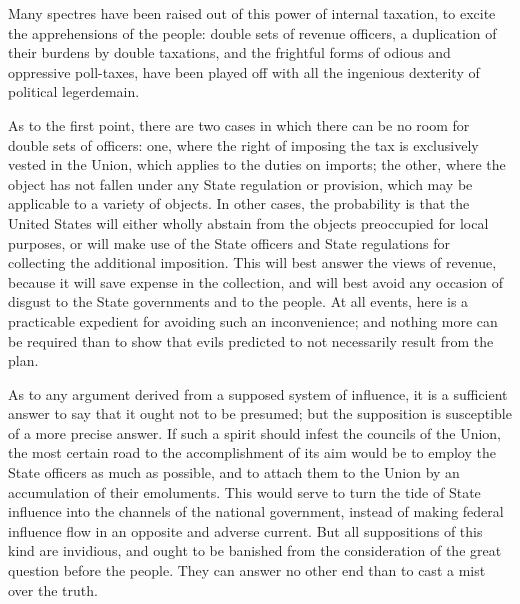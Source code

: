 Many spectres have been raised out of this power of internal taxation, to excite the apprehensions of the people: double sets of revenue officers, a duplication of their burdens by double taxations, and the frightful forms of odious and oppressive poll-taxes, have been played off with all the ingenious dexterity of political legerdemain.

As to the first point, there are two cases in which there can be no room for double sets of officers: one, where the right of imposing the tax is exclusively vested in the Union, which applies to the duties on imports; the other, where the object has not fallen under any State regulation or provision, which may be applicable to a variety of objects. 
In other cases, the probability is that the United States will either wholly abstain from the objects preoccupied for local purposes, or will make use of the State officers and State regulations for collecting the additional imposition. 
This will best answer the views of revenue, because it will save expense in the collection, and will best avoid any occasion of disgust to the State governments and to the people. 
At all events, here is a practicable expedient for avoiding such an inconvenience; and nothing more can be required than to show that evils predicted to not necessarily result from the plan.

As to any argument derived from a supposed system of influence, it is a sufficient answer to say that it ought not to be presumed; but the supposition is susceptible of a more precise answer. 
If such a spirit should infest the councils of the Union, the most certain road to the accomplishment of its aim would be to employ the State officers as much as possible, and to attach them to the Union by an accumulation of their emoluments. 
This would serve to turn the tide of State influence into the channels of the national government, instead of making federal influence flow in an opposite and adverse current. 
But all suppositions of this kind are invidious, and ought to be banished from the consideration of the great question before the people. 
They can answer no other end than to cast a mist over the truth.


